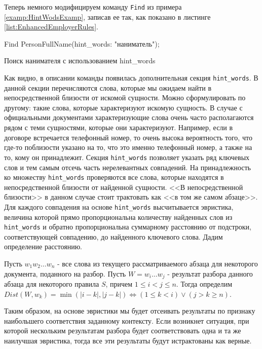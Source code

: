 Теперь немного модифицируем команду \lstinline{Find} из примера \ref{examp:HintWodsExamp}, записав ее так, как показано в листинге \ref{list:EnhancedEmployerRules}.
\begin{ListingEnv}
\begin{Verb}

Find PersonFullName(hint_words: "наниматель");
\end{Verb}
\caption{Поиск нанимателя с использованием hint\_words}
\label{list:EnhancedEmployerRules}
\end{ListingEnv}
Как видно, в описании команды появилась дополнительная секция \lstinline{hint_words}. В данной секции перечисляются слова, которые мы ожидаем найти в непосредственной близости от искомой сущности. Можно сформулировать по другому: такие слова, которые характеризуют искомую сущность. В случае с официальными документами характеризующие слова очень часто располагаются рядом с теми сущностями, которые они характеризуют. Например, если в договоре встречается телефонный номер, то очень высока вероятность того, что где-то поблизости указано на то, что это именно телефонный номер, а также на то, кому он принадлежит. Секция \lstinline{hint_words} позволяет указать ряд ключевых слов и тем самым отсечь часть нерелевантных совпадений. На принадлежность ко множеству \lstinline{hint_words} проверяются все слова, которые находятся в непосредственной близости от найденной сущности. <<В непосредственной близости>> в данном случае стоит трактовать как <<в том же самом абзаце>>. Для каждого совпадения на основе \lstinline{hint_words} высчитывается эвристика, величина которой прямо пропорциональна количеству найденных слов из \lstinline{hint_words} и обратно пропорциональна суммарному расстоянию от подстроки, соответствующей совпадению, до найденного ключевого слова. Дадим определение расстоянию.
\begin{mydefinition}
Пусть $w_1 w_2 \dots w_n$ - все слова из текущего рассматриваемого абзаца для некоторого документа, поданного на разбор. Пусть  $W = w_i \dots w_j$ - результат разбора данного абзаца для некоторого правила $S$, причем $1 \leq i < j \leq n$. Тогда определим $Dist(W, w_k) = \min(|i - k|, |j - k|) \iff (1 \leq k < i) \lor (j > k \geq n)$.
\end{mydefinition}
Таким образом, на основе эвристики мы будет отсеивать результаты по признаку наибольшего соответствия заданному контексту. Если возникнет ситуация, при которой нескольким результатам разбора будет соответствовать одна и та же наилучшая эвристика, тогда все эти результаты будут истрактованы как верные.

